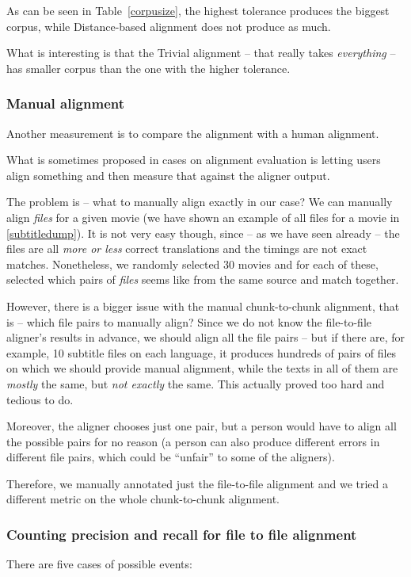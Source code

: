 As can be seen in Table~\ref{corpusize}, the highest tolerance produces the biggest corpus, while Distance-based alignment does not produce as much.

What is interesting is that the Trivial alignment -- that really takes \emph{everything} -- has smaller corpus than the one with the higher tolerance.


\subsubsection{Manual alignment}
Another measurement is to compare the alignment with a human alignment.

What is sometimes proposed in cases on alignment evaluation is letting users align something and then measure that against the aligner output.

The problem is -- what to manually align exactly in our case? We can manually align \emph{files} for a given movie (we have shown an example of all files for a movie in \ref{subtitledump}). It is not very easy though, since -- as we have seen already -- the files are all \emph{more or less} correct translations and the timings are not exact matches. Nonetheless, we randomly selected 30 movies and for each of these, selected which pairs of \emph{files} seems like from the same source and match together.

However, there is a bigger issue with the manual chunk-to-chunk alignment, that is -- which file pairs to manually align? Since we do not know the file-to-file aligner's results in advance, we should align all the file pairs -- but if there are, for example, 10 subtitle files on each language, it produces hundreds of pairs of files on which we should provide manual alignment, while the texts in all of them are \emph{mostly} the same, but \emph{not exactly} the same. This actually proved too hard and tedious to do.

Moreover, the aligner chooses just one pair, but a person would have to align all the possible pairs for no reason (a person can also produce different errors in different file pairs, which could be ``unfair'' to some of the aligners).

Therefore, we manually annotated just the file-to-file alignment and we tried a different metric on the whole chunk-to-chunk alignment.

\subsubsection{Counting precision and recall for file to file alignment}
There are five cases of possible events:

